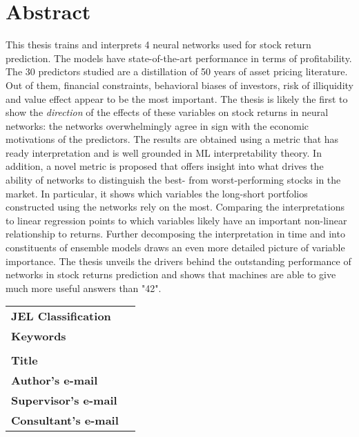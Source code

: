 \section*{Abstract}

This thesis trains and interprets 4 neural networks used for stock return prediction. The models have state-of-the-art performance in terms of profitability. The 30 predictors studied are a distillation of 50 years of asset pricing literature. Out of them, financial constraints, behavioral biases of investors, risk of illiquidity and value effect appear to be the most important. The thesis is likely the first to show the \textit{direction} of the effects of these variables on stock returns in neural networks: the networks overwhelmingly agree in sign with the economic motivations of the predictors. The results are obtained using a metric that has ready interpretation and is well grounded in ML interpretability theory. In addition, a novel metric is proposed that offers insight into what drives the ability of networks to distinguish the best- from worst-performing stocks in the market. In particular, it shows which variables the long-short portfolios constructed using the networks rely on the most. Comparing the interpretations to linear regression points to which variables likely have an important non-linear relationship to returns. Further decomposing the interpretation in time and into constituents of ensemble models draws an even more detailed picture of variable importance. The thesis unveils the drivers behind the outstanding performance of networks in stock returns prediction and shows that machines are able to give much more useful answers than "42".  

\bigskip

\begin{tabular}{lp{8.6cm}}
		\textbf{JEL Classification} & \JEL \\
		\textbf{Keywords} & \Keywords \\
 		& \\
		\textbf{Title} & \Bookname \\
 		\textbf{Author's e-mail} & \texttt{\href{mailto:\Email}{\Email}}\\
		\textbf{Supervisor's e-mail} & \texttt{\href{mailto:\EmailSup}{\EmailSup}}\\
		\textbf{Consultant's e-mail} & \texttt{\href{mailto:\EmailCon}{\EmailCon}}\\
\end{tabular}

\bigskip

